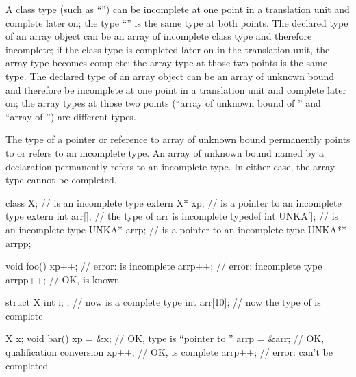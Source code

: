 \pnum
A class type (such as ``'') can be incomplete at one
point in a translation unit and complete later on; the type
``'' is the same type at both points. The declared type
of an array object can be an array of incomplete class type and
therefore incomplete; if the class type is completed later on in the
translation unit, the array type becomes complete; the array type at
those two points is the same type. The declared type of an array object
can be an array of unknown bound and therefore be incomplete at one
point in a translation unit and complete later on; the array types at
those two points (``array of unknown bound of '' and ``array of
 '') are different types.
\begin{note}
The type of a pointer or reference to array of unknown bound
permanently points to or refers to an incomplete type.
An array of unknown bound named by a  declaration
permanently refers to an incomplete type.
In either case, the array type cannot be completed.
\end{note}
\begin{example}
%
\begin{codeblock}
class X;                        //  is an incomplete type
extern X* xp;                   //  is a pointer to an incomplete type
extern int arr[];               // the type of arr is incomplete
typedef int UNKA[];             //  is an incomplete type
UNKA* arrp;                     //  is a pointer to an incomplete type
UNKA** arrpp;

void foo() {
  xp++;                         // error:  is incomplete
  arrp++;                       // error: incomplete type
  arrpp++;                      // OK,  is known
}

struct X { int i; };            // now  is a complete type
int arr[10];                    // now the type of  is complete

X x;
void bar() {
  xp = &x;                      // OK, type is ``pointer to ''
  arrp = &arr;                  // OK, qualification conversion
  xp++;                         // OK,  is complete
  arrp++;                       // error:  can't be completed
}
\end{codeblock}
\end{example}

